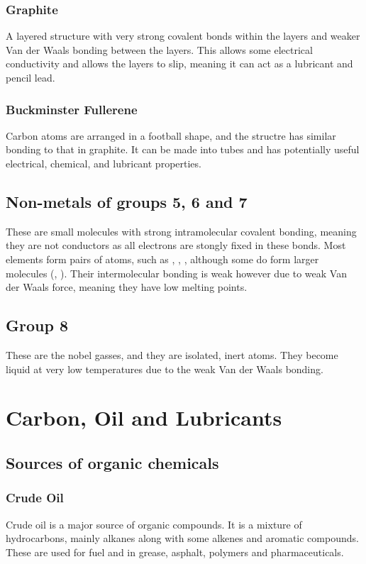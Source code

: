 \documentclass[a4paper, 12pt]{article}
\begin{document}
		\subsubsection{Graphite}
			A layered structure with very strong covalent bonds within the layers and weaker Van der Waals bonding between the layers. This allows some electrical conductivity and allows the layers to slip, meaning it can act as a lubricant and pencil lead.
		\subsubsection{Buckminster Fullerene}
			Carbon atoms are arranged in a football shape, and the structre has similar bonding to that in graphite. It can be made into tubes and has potentially useful electrical, chemical, and lubricant properties.
	
	\subsection{Non-metals of groups 5, 6 and 7}
		These are small molecules with strong intramolecular covalent bonding, meaning they are not conductors as all electrons are stongly fixed in these bonds. Most elements form pairs of atoms, such as , , , although some do form larger molecules (, ). Their intermolecular bonding is weak however due to weak Van der Waals force, meaning they have low melting points. 
		
	\subsection{Group 8}
		These are the nobel gasses, and they are isolated, inert atoms. They become liquid at very low temperatures due to the weak Van der Waals bonding. 
		
\newpage

\section{Carbon, Oil and Lubricants}
	\subsection{Sources of organic chemicals}
		\subsubsection*{Crude Oil}
			Crude oil is a major source of organic compounds. It is a mixture of hydrocarbons, mainly alkanes along with some alkenes and aromatic compounds. These are used for fuel and in grease, asphalt, polymers and pharmaceuticals.
\end{document}
